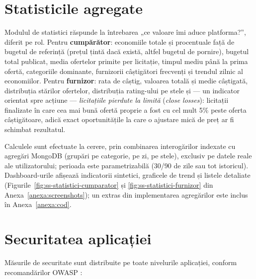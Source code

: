 \section{Statisticile agregate}

Modulul de statistici răspunde la întrebarea „ce valoare îmi aduce platforma?'', diferit pe rol. Pentru \textbf{cumpărător}: economiile totale și procentuale față de bugetul de referință (prețul țintă dacă există, altfel bugetul de pornire), bugetul total publicat, media ofertelor primite per licitație, timpul mediu până la prima ofertă, categoriile dominante, furnizorii câștigători frecvenți și trendul zilnic al economiilor. Pentru \textbf{furnizor}: rata de câștig, valoarea totală și medie câștigată, distribuția stărilor ofertelor, distribuția rating-ului pe stele și --- un indicator orientat spre acțiune --- \textit{licitațiile pierdute la limită} (\textit{close losses}): licitații finalizate în care cea mai bună ofertă proprie a fost cu cel mult 5\% peste oferta câștigătoare, adică exact oportunitățile la care o ajustare mică de preț ar fi schimbat rezultatul.

Calculele sunt efectuate la cerere, prin combinarea interogărilor indexate cu agregări MongoDB (grupări pe categorie, pe zi, pe stele), exclusiv pe datele reale ale utilizatorului; perioada este parametrizabilă (30/90 de zile sau tot istoricul). Dashboard-urile afișează indicatorii sintetici, graficele de trend și listele detaliate (Figurile~\ref{fig:ss-statistici-cumparator} și \ref{fig:ss-statistici-furnizor} din Anexa~\ref{anexa:screenshots}); un extras din implementarea agregărilor este inclus în Anexa~\ref{anexa:cod}.

\section{Securitatea aplicației}

Măsurile de securitate sunt distribuite pe toate nivelurile aplicației, conform recomandărilor OWASP \cite{owasp2021}:


